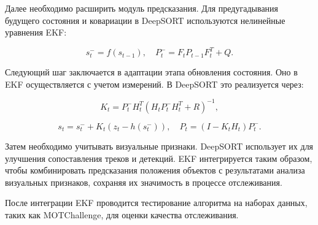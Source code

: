 Далее необходимо расширить модуль предсказания. Для предугадывания будущего состояния и ковариации в DeepSORT используются нелинейные уравнения EKF:

\begin{equation}
{s}_t^- = f({s}_{t-1}), \quad {P}_t^- = {F}_t {P}_{t-1} {F}_t^T + {Q}.
\end{equation}

Следующий шаг заключается в адаптации этапа обновления состояния. Оно в EKF осуществляется с учетом измерений. В DeepSORT это реализуется через:

\begin{equation}
{K}_t = {P}_t^- {H}_t^T ({H}_t {P}_t^- {H}_t^T + {R})^{-1},
\end{equation}

\begin{equation}
{s}_t = {s}_t^- + {K}_t ({z}_t - h({s}_t^-)), \quad {P}_t = ({I} - {K}_t {H}_t) {P}_t^-.
\end{equation}

Затем необходимо учитывать визуальные признаки. DeepSORT использует их для улучшения сопоставления треков и детекций. EKF интегрируется таким образом, чтобы комбинировать предсказания положения объектов с результатами анализа визуальных признаков, сохраняя их значимость в процессе отслеживания.

После интеграции EKF проводится тестирование алгоритма на наборах данных, таких как MOTChallenge, для оценки качества отслеживания.